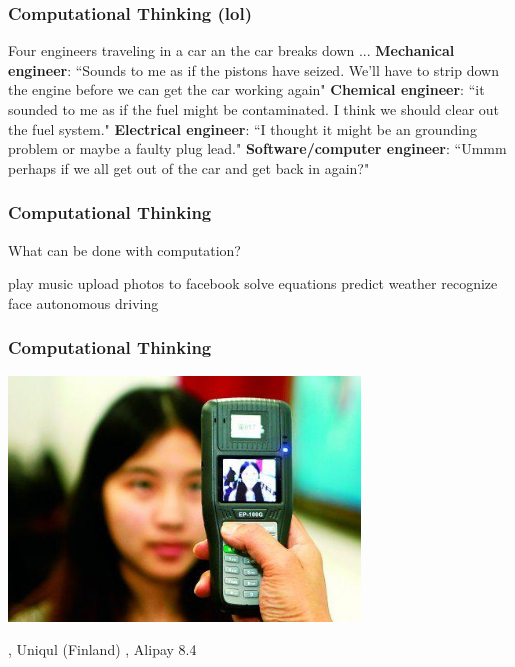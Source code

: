 \documentclass[11pt]{beamer}
\begin{document}
\begin{frame}
	\frametitle{Computational Thinking (lol)}
	\Enlarge
	\begin{itemize}
		\myitem Four engineers traveling in a car an the car breaks down ...
		\myitem \textbf{Mechanical engineer}: ``Sounds to me as if the pistons have seized. We'll have to strip down the engine before we can get the car working again"
		\myitem \textbf{Chemical engineer}: ``it sounded to me as if the fuel might be contaminated. I think we should clear out the fuel system."
		\myitem \textbf{Electrical engineer}: ``I thought it might be an grounding problem or maybe a faulty plug lead."
		\myitem \textbf{Software/computer engineer}: ``Ummm perhaps if we all get out of the car and get back in again?"
	\end{itemize}
\end{frame}

\begin{frame}
	\frametitle{Computational Thinking}
	\Enlarge
	\begin{itemize}
		\myitem What can be done with computation? \pause
		\begin{itemize}
	  		\mysubitem play music \pause
			\mysubitem upload photos to facebook \pause
			\mysubitem solve equations \pause
			\mysubitem predict weather \pause
            		\mysubitem recognize face \pause
			\mysubitem autonomous driving
		\end{itemize}
	\end{itemize}
\end{frame}



\begin{frame}
	\frametitle{Computational Thinking}
	\Enlarge
	\hspace{5mm} \includegraphics[width=0.7\textwidth]{./img/facepay.jpg}\\ \pause
	\begin{itemize}
	  		, Uniqul (Finland)
			, Alipay 8.4
	\end{itemize}
\end{frame}
\end{document}
